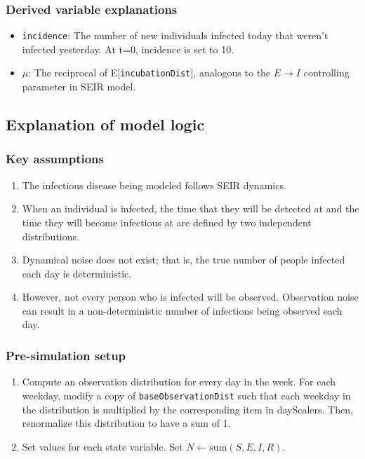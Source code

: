 \documentclass{article}
\newcommand{\code}[1]{\texttt{#1}}
\begin{document}
\subsubsection{Derived variable explanations}
\begin{itemize}
    \item \code{incidence}: The number of new individuals infected today that weren't infected yesterday. At t=0, incidence is set to 10.
    \item $\mu$: The reciprocal of E[\code{incubationDist}], analogous to the $E \rightarrow I$ controlling parameter in SEIR model.
\end{itemize}

\subsection{Explanation of model logic}

\subsubsection{Key assumptions}

\begin{enumerate}
	\item The infectious disease being modeled follows SEIR dynamics.
	\item When an individual is infected, the time that they will be detected at and the time they will become infectious at are defined by two independent distributions.
	\item Dynamical noise does not exist; that is, the true number of people infected each day is deterministic.  
	\item However, not every person who is infected will be observed. Observation noise can result in a non-deterministic number of infections being observed each day. 

\end{enumerate}

\subsubsection{Pre-simulation setup}

\begin{enumerate}
    \item Compute an observation distribution for every day in the week. For each weekday, modify a copy of \code{baseObservationDist} such that each weekday in the distribution is multiplied by the corresponding item in dayScalers. Then, renormalize this distribution to have a sum of 1.
    
    \item Set values for each state variable. Set $N \gets \mathrm{sum}(S, E, I, R)$. 

\end{enumerate}
\end{document}
